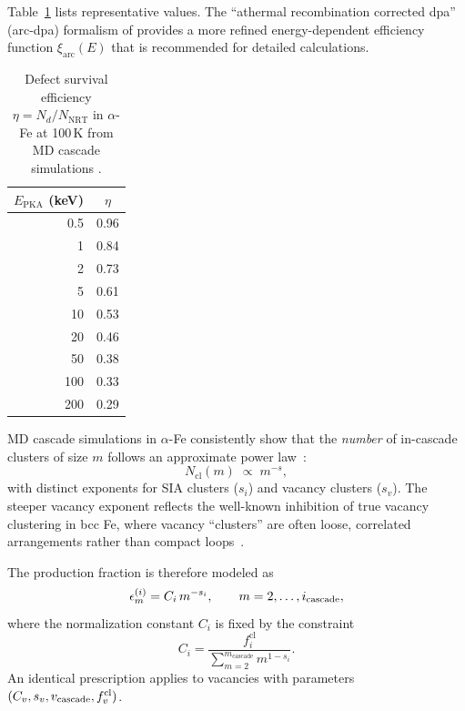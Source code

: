 \documentclass[pdflatex,sn-basic]{sn-jnl} %
\newcommand{\cascade}{_{\text{cascade}}}
\begin{document}
Table~\ref{tab:survival} lists representative values.  The
``athermal recombination corrected dpa'' (arc-dpa) formalism of
\cite{Nordlund2018PrimaryDamageReview} provides a more refined
energy-dependent efficiency function $\xi_{\mathrm{arc}}(E)$ that
is recommended for detailed calculations.

\begin{table}[htbp]
\centering
\caption{Defect survival efficiency $\eta = N_d/N_{\mathrm{NRT}}$ in
$\alpha$-Fe at 100\,K from MD cascade simulations
\cite{Stoller2000RoleCascadeEnergyTemperature,Nordlund2018PrimaryDamageReview}.}
\label{tab:survival}
\begin{tabular}{r c}
\toprule
$E_{\mathrm{PKA}}$ (keV) & $\eta$ \\
\midrule
  0.5 & 0.96 \\
  1   & 0.84 \\
  2   & 0.73 \\
  5   & 0.61 \\
 10   & 0.53 \\
 20   & 0.46 \\
 50   & 0.38 \\
100   & 0.33 \\
200   & 0.29 \\
\bottomrule
\end{tabular}
\end{table}

MD cascade simulations in $\alpha$-Fe consistently show that the
\emph{number} of in-cascade clusters of size $m$ follows an approximate
power law~\cite{Stoller1998PointDefectClusterFormation,
Stoller2000RoleCascadeEnergyTemperature,
DeBacker2018FragmentedCascades,Calder2010LargeInterstitialOrigin}:
\begin{equation}
  N_{\mathrm{cl}}(m) \;\propto\; m^{-s},
  \label{eq:powerlaw}
\end{equation}
with distinct exponents for SIA clusters ($s_i$) and vacancy clusters
($s_v$).  The steeper vacancy exponent reflects the well-known
inhibition of true vacancy clustering in bcc Fe, where vacancy ``clusters''
are often loose, correlated arrangements rather than compact
loops~\cite{Stoller1998PointDefectClusterFormation,
Soneda2001VacancyLoopCascadeCollapse}.

The production fraction is therefore modeled as
\begin{equation}
  \epsilon_m^{(i)} = C_i\,m^{-s_i}, \qquad m = 2,\ldots,i_{\rm cascade},
  \label{eq:eps_i_model}
\end{equation}
where the normalization constant $C_i$ is fixed by the constraint
\begin{equation}
  C_i = \frac{f_i^{\mathrm{cl}}}
             {\displaystyle\sum_{m=2}^{m\cascade} m^{1-s_i}}.
  \label{eq:Ci}
\end{equation}
An identical prescription applies to vacancies with parameters
$(C_v, s_v, v_{\rm cascade}, f_v^{\mathrm{cl}})$.
\end{document}
